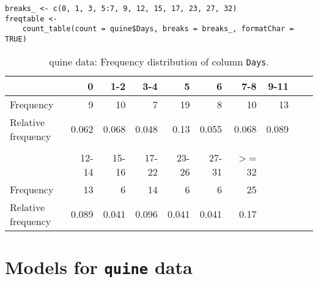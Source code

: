 \documentclass[a4paper,twoside,11pt]{article}
\begin{document}
\begin{verbatim}
breaks_ <- c(0, 1, 3, 5:7, 9, 12, 15, 17, 23, 27, 32)
freqtable <- 
    count_table(count = quine$Days, breaks = breaks_, formatChar = TRUE)
\end{verbatim}



\begin{table}
\centering
\begin{tabular}{lrrrrrrrrr}

 & 0 & 1-2 & 3-4 & 5 & 6 & 7-8 & 9-11 \\ 
  \hline
Frequency & 9 & 10 & 7 & 19 & 8 & 10 & 13 \\ 
  Relative frequency & 0.062 & 0.068 & 0.048 & 0.13 & 0.055 & 0.068 & 0.089 \\ 
   \hline

\\[5pt]
 & 12-14 & 15-16 & 17-22 & 23-26 & 27-31 & $>$= 32 \\ 
  \hline
Frequency & 13 & 6 & 14 & 6 & 6 & 25 \\ 
  Relative frequency & 0.089 & 0.041 & 0.096 & 0.041 & 0.041 & 0.17 \\ 
   \hline

\end{tabular}
\caption{quine data: Frequency distribution of column \texttt{Days}.}
\label{tab:quine:days}
\end{table}



\section{Models for \texttt{quine} data}
\label{sec:orgd1e9d6d}
\end{document}
